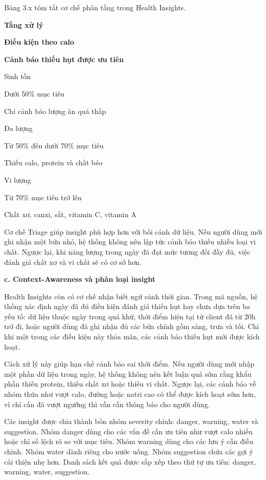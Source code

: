 Bảng 3.x tóm tắt cơ chế phân tầng trong Health Insights.

\textbf{Tầng xử lý}

\textbf{Điều kiện theo calo}

\textbf{Cảnh báo thiếu hụt được ưu tiên}

Sinh tồn

Dưới 50\% mục tiêu

Chỉ cảnh báo lượng ăn quá thấp

Đa lượng

Từ 50\% đến dưới 70\% mục tiêu

Thiếu calo, protein và chất béo

Vi lượng

Từ 70\% mục tiêu trở lên

Chất xơ, canxi, sắt, vitamin C, vitamin A

Cơ chế Triage giúp insight phù hợp hơn với bối cảnh dữ liệu. Nếu người dùng mới ghi nhận một bữa nhỏ, hệ thống không nên lập tức cảnh báo thiếu nhiều loại vi chất. Ngược lại, khi năng lượng trong ngày đã đạt mức tương đối đầy đủ, việc đánh giá chất xơ và vi chất sẽ có cơ sở hơn.

\textbf{c. Context-Awareness và phân loại insight}

Health Insights còn có cơ chế nhận biết ngữ cảnh thời gian. Trong mã nguồn, hệ thống xác định ngày đã đủ điều kiện đánh giá thiếu hụt hay chưa dựa trên ba yếu tố: dữ liệu thuộc ngày trong quá khứ, thời điểm hiện tại từ client đã từ 20h trở đi, hoặc người dùng đã ghi nhận đủ các bữa chính gồm sáng, trưa và tối. Chỉ khi một trong các điều kiện này thỏa mãn, các cảnh báo thiếu hụt mới được kích hoạt.

Cách xử lý này giúp hạn chế cảnh báo sai thời điểm. Nếu người dùng mới nhập một phần dữ liệu trong ngày, hệ thống không nên kết luận quá sớm rằng khẩu phần thiếu protein, thiếu chất xơ hoặc thiếu vi chất. Ngược lại, các cảnh báo về nhóm thừa như vượt calo, đường hoặc natri cao có thể được kích hoạt sớm hơn, vì chỉ cần đã vượt ngưỡng thì vẫn cần thông báo cho người dùng.

Các insight được chia thành bốn nhóm severity chính: danger, warning, water và suggestion. Nhóm danger dùng cho các vấn đề cần ưu tiên như vượt calo nhiều hoặc chỉ số lệch rõ so với mục tiêu. Nhóm warning dùng cho các lưu ý cần điều chỉnh. Nhóm water dành riêng cho nước uống. Nhóm suggestion chứa các gợi ý cải thiện nhẹ hơn. Danh sách kết quả được sắp xếp theo thứ tự ưu tiên: danger, warning, water, suggestion.

